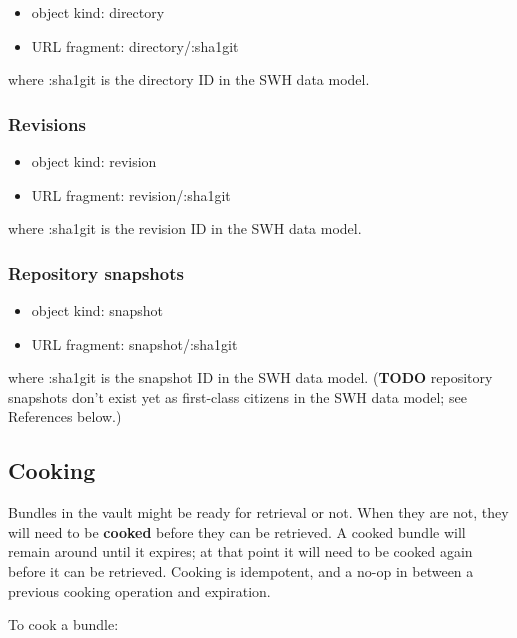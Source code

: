 \begin{itemize}
\itemsep1pt\parskip0pt
\item
  object kind: directory
\item
  URL fragment: directory/:sha1git
\end{itemize}

where :sha1git is the directory ID in the SWH data model.

\subsubsection{Revisions}\label{revisions}

\begin{itemize}
\itemsep1pt\parskip0pt
\item
  object kind: revision
\item
  URL fragment: revision/:sha1git
\end{itemize}

where :sha1git is the revision ID in the SWH data model.

\subsubsection{Repository snapshots}\label{repository-snapshots}

\begin{itemize}
\itemsep1pt\parskip0pt
\item
  object kind: snapshot
\item
  URL fragment: snapshot/:sha1git
\end{itemize}

where :sha1git is the snapshot ID in the SWH data model. (\textbf{TODO}
repository snapshots don't exist yet as first-class citizens in the SWH
data model; see References below.)

\subsection{Cooking}\label{cooking}

Bundles in the vault might be ready for retrieval or not. When they are
not, they will need to be \textbf{cooked} before they can be retrieved.
A cooked bundle will remain around until it expires; at that point it
will need to be cooked again before it can be retrieved. Cooking is
idempotent, and a no-op in between a previous cooking operation and
expiration.

To cook a bundle:

